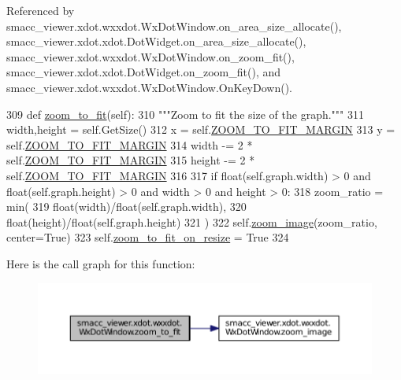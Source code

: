 Referenced by smacc\+\_\+viewer.\+xdot.\+wxxdot.\+Wx\+Dot\+Window.\+on\+\_\+area\+\_\+size\+\_\+allocate(), smacc\+\_\+viewer.\+xdot.\+xdot.\+Dot\+Widget.\+on\+\_\+area\+\_\+size\+\_\+allocate(), smacc\+\_\+viewer.\+xdot.\+wxxdot.\+Wx\+Dot\+Window.\+on\+\_\+zoom\+\_\+fit(), smacc\+\_\+viewer.\+xdot.\+xdot.\+Dot\+Widget.\+on\+\_\+zoom\+\_\+fit(), and smacc\+\_\+viewer.\+xdot.\+wxxdot.\+Wx\+Dot\+Window.\+On\+Key\+Down().


\begin{DoxyCode}
309   \textcolor{keyword}{def }\hyperlink{classsmacc__viewer_1_1xdot_1_1wxxdot_1_1WxDotWindow_a06fdd60784dd744806e321a4d3959569}{zoom\_to\_fit}(self):
310     \textcolor{stringliteral}{"""Zoom to fit the size of the graph."""}
311     width,height = self.GetSize()
312     x = self.\hyperlink{classsmacc__viewer_1_1xdot_1_1wxxdot_1_1WxDotWindow_af9687848f34831a999813841652a08ae}{ZOOM\_TO\_FIT\_MARGIN}
313     y = self.\hyperlink{classsmacc__viewer_1_1xdot_1_1wxxdot_1_1WxDotWindow_af9687848f34831a999813841652a08ae}{ZOOM\_TO\_FIT\_MARGIN}
314     width -= 2 * self.\hyperlink{classsmacc__viewer_1_1xdot_1_1wxxdot_1_1WxDotWindow_af9687848f34831a999813841652a08ae}{ZOOM\_TO\_FIT\_MARGIN}
315     height -= 2 * self.\hyperlink{classsmacc__viewer_1_1xdot_1_1wxxdot_1_1WxDotWindow_af9687848f34831a999813841652a08ae}{ZOOM\_TO\_FIT\_MARGIN}
316 
317     \textcolor{keywordflow}{if} float(self.graph.width) > 0 \textcolor{keywordflow}{and} float(self.graph.height) > 0 \textcolor{keywordflow}{and} width > 0 \textcolor{keywordflow}{and} height > 0:
318       zoom\_ratio = min(
319         float(width)/float(self.graph.width),
320         float(height)/float(self.graph.height)
321       )
322       self.\hyperlink{classsmacc__viewer_1_1xdot_1_1wxxdot_1_1WxDotWindow_a2bf85fb763c88fed05071ebb1fad5b57}{zoom\_image}(zoom\_ratio, center=\textcolor{keyword}{True})
323       self.\hyperlink{classsmacc__viewer_1_1xdot_1_1wxxdot_1_1WxDotWindow_ad624d96f745b20c66119a35fa1d65ae6}{zoom\_to\_fit\_on\_resize} = \textcolor{keyword}{True}
324 
\end{DoxyCode}


Here is the call graph for this function\+:
\nopagebreak
\begin{figure}[H]
\begin{center}
\leavevmode
\includegraphics[width=350pt]{classsmacc__viewer_1_1xdot_1_1wxxdot_1_1WxDotWindow_a06fdd60784dd744806e321a4d3959569_cgraph}
\end{center}
\end{figure}




